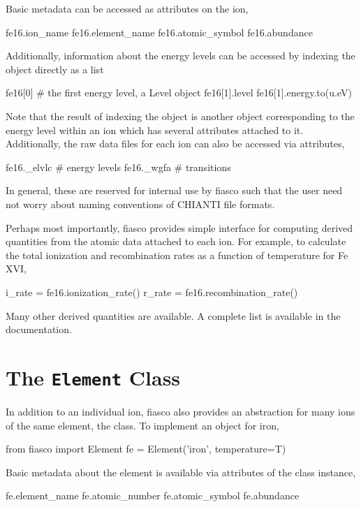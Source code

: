 Basic metadata can be accessed as attributes on the ion,
\begin{pyverbatim}[appendix1][baselinestretch=1,xleftmargin=3em]
fe16.ion_name
fe16.element_name
fe16.atomic_symbol
fe16.abundance
\end{pyverbatim}
Additionally, information about the energy levels can be accessed by indexing the object directly as a list
\begin{pyverbatim}[appendix1][baselinestretch=1,xleftmargin=3em]
fe16[0] # the first energy level, a Level object
fe16[1].level
fe16[1].energy.to(u.eV)
\end{pyverbatim}
Note that the result of indexing the  object is another object corresponding to the energy level within an ion which has several attributes attached to it. Additionally, the raw data files for each ion can also be accessed via attributes,
\begin{pyverbatim}[appendix1][baselinestretch=1,xleftmargin=3em]
fe16._elvlc # energy levels
fe16._wgfa # transitions 
\end{pyverbatim}
In general, these are reserved for internal use by fiasco such that the user need not worry about naming conventions of CHIANTI file formats.

Perhaps most importantly, fiasco provides simple interface for computing derived quantities from the atomic data attached to each ion. For example, to calculate the total ionization and recombination rates as a function of temperature for Fe XVI,
\begin{pyverbatim}[appendix1][baselinestretch=1,xleftmargin=3em]
i_rate = fe16.ionization_rate()
r_rate = fe16.recombination_rate()
\end{pyverbatim}
Many other derived quantities are available. A complete list is available in the documentation.

\section{The \texttt{Element} Class}\label{sec:fiasco-element}

In addition to an individual ion, fiasco also provides an abstraction for many ions of the same element, the  class. To implement an  object for iron,
\begin{pyverbatim}[appendix1][baselinestretch=1,xleftmargin=3em]
from fiasco import Element
fe = Element('iron', temperature=T)
\end{pyverbatim}
Basic metadata about the element is available via attributes of the class instance,
\begin{pyverbatim}[appendix1][baselinestretch=1,xleftmargin=3em]
fe.element_name
fe.atomic_number
fe.atomic_symbol
fe.abundance
\end{pyverbatim}

